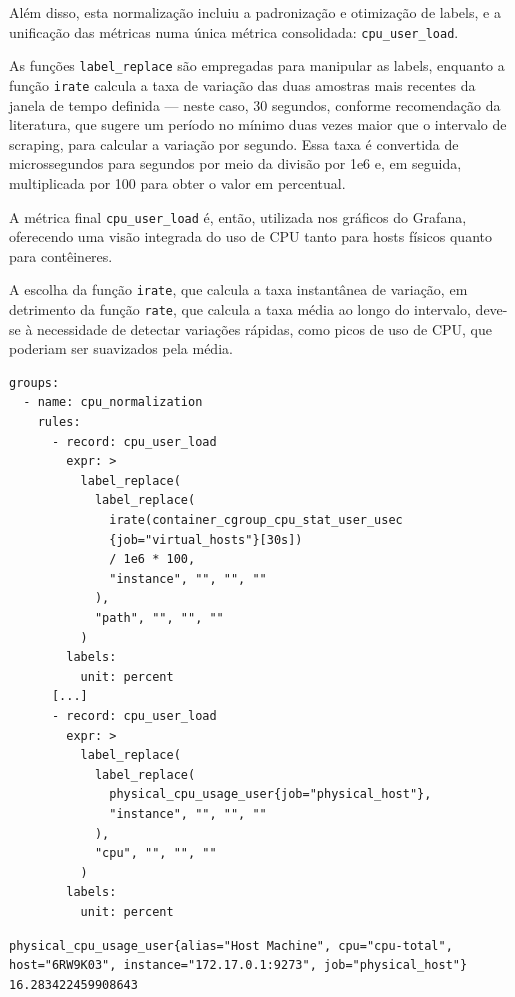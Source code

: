 {Além disso, esta normalização incluiu a padronização e otimização de labels, e a unificação das métricas numa única métrica consolidada: \verb|cpu_user_load|.

As funções \verb|label_replace| são empregadas para manipular as labels, enquanto a função \verb|irate| calcula a taxa de variação das duas amostras mais recentes da janela de tempo definida --- neste caso, 30 segundos, conforme recomendação da literatura, que sugere um período no mínimo duas vezes maior que o intervalo de scraping, para calcular a variação por segundo. Essa taxa é convertida de microssegundos para segundos por meio da divisão por 1e6 e, em seguida, multiplicada por 100 para obter o valor em percentual.

A métrica final \verb|cpu_user_load| é, então, utilizada nos gráficos do Grafana, oferecendo uma visão integrada do uso de CPU tanto para hosts físicos quanto para contêineres.

A escolha da função \verb|irate|, que calcula a taxa instantânea de variação, em detrimento da função \verb|rate|, que calcula a taxa média ao longo do intervalo, deve-se à necessidade de detectar variações rápidas, como picos de uso de CPU, que poderiam ser suavizados pela média.

\begin{lstlisting}[caption={Arquivo cpu.yml}, label={lst:cpu_user_load}]
groups:
  - name: cpu_normalization
    rules:
      - record: cpu_user_load
        expr: >
          label_replace(
            label_replace(
              irate(container_cgroup_cpu_stat_user_usec
              {job="virtual_hosts"}[30s]) 
              / 1e6 * 100,
              "instance", "", "", ""
            ),
            "path", "", "", ""
          )
        labels:
          unit: percent
      [...]
      - record: cpu_user_load
        expr: >
          label_replace(
            label_replace(
              physical_cpu_usage_user{job="physical_host"},
              "instance", "", "", ""
            ),
            "cpu", "", "", ""
          )
        labels:
          unit: percent
\end{lstlisting}

\newpage

\begin{lstlisting}[caption={Métricas de CPU - Carga de usuário obtidas do Telegraf}, label={lst:telegraf-cpu-user-load}]
  physical_cpu_usage_user{alias="Host Machine", cpu="cpu-total", host="6RW9K03", instance="172.17.0.1:9273", job="physical_host"}	16.283422459908643


\end{lstlisting}}

